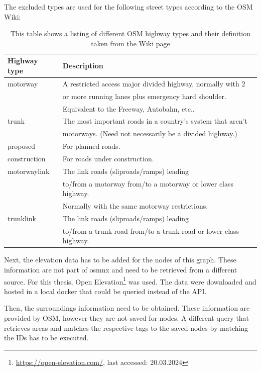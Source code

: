 The excluded types are used for the following street types according to the OSM Wiki:
\begin{table}[ht]
	\centering
	\begin{tabular}{l|l}
		Highway type & Description\\
		\hline
		motorway & A restricted access major divided highway, normally with 2\\ 
		& or more running lanes plus emergency hard shoulder.\\
		& Equivalent to the Freeway, Autobahn, etc..  \\
		trunk & The most important roads in a country's system that aren't \\
		& motorways. (Need not necessarily be a divided highway.) \\
		proposed & For planned roads. \\
		construction & For roads under construction. \\
		motorway\textunderscore link & The link roads (sliproads/ramps) leading\\
		& to/from a motorway from/to a motorway or lower class highway. \\
		& Normally with the same motorway restrictions. \\
		trunk\textunderscore link & The link roads (sliproads/ramps) leading \\
		& to/from a trunk road from/to a trunk road or lower class highway. 
	\end{tabular}
	\caption[OSM highway types]{This table shows a listing of different OSM highway types and their definition taken from the Wiki page\protect\footnotemark}
	\label{tab:osmHighwayTypes}
\end{table}


Next, the elevation data has to be added for the nodes of this graph.
These information are not part of osmnx and need to be retrieved from a different source.
For this thesis, Open Elevation\footnote{\url{https://open-elevation.com/}, last accessed: 20.03.2024} was used.
The data were downloaded and hosted in a local docker that could be queried instead of the API.

Then, the surroundings information need to be obtained. 
These information are provided by OSM, however they are not saved for nodes.
A different query that retrieves areas and matches the respective tags to the saved nodes by matching the IDs has to be executed.

